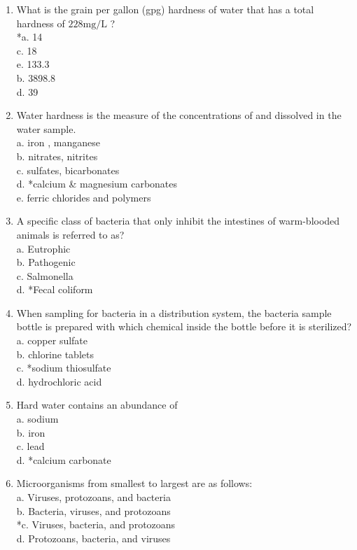 \begin{enumerate}[1.]
\item What is the grain per gallon (gpg) hardness of water that has a total hardness of $228 \mathrm{mg} / \mathrm{L}$ ?\\
*a. 14\\
c. 18\\
e. 133.3\\
b. 3898.8\\
d. 39\\

  \item Water hardness is the measure of the concentrations of and dissolved in the water sample.\\
a. iron , manganese\\
b. nitrates, nitrites\\
c. sulfates, bicarbonates\\
d. *calcium \& magnesium carbonates\\
e. ferric chlorides and polymers\\

  \item A specific class of bacteria that only inhibit the intestines of warm-blooded animals is referred to as?\\
a. Eutrophic\\
b. Pathogenic\\
c. Salmonella\\
d. *Fecal coliform\\

  \item When sampling for bacteria in a distribution system, the bacteria sample bottle is prepared with which chemical inside the bottle before it is sterilized?\\
a. copper sulfate\\
b. chlorine tablets\\
c. *sodium thiosulfate\\
d. hydrochloric acid\\

  \item Hard water contains an abundance of\\
a. sodium\\
b. iron\\
c. lead\\
d. *calcium carbonate\\

  \item Microorganisms from smallest to largest are as follows:\\
a. Viruses, protozoans, and bacteria\\
b. Bacteria, viruses, and protozoans\\
*c. Viruses, bacteria, and protozoans\\
d. Protozoans, bacteria, and viruses\\


\end{enumerate}
